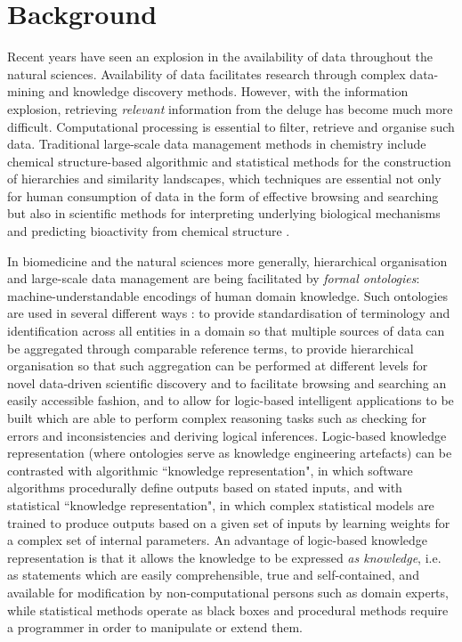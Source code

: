 \documentclass[10pt]{bmc_article}
\newenvironment{bmcformat}{\baselineskip20pt\sloppy\setboolean{publ}{false}}{\baselineskip20pt\sloppy}
\begin{document}
\begin{bmcformat}
\section*{Background}

Recent years have seen an explosion in the availability of data throughout the natural sciences. Availability of data facilitates research through complex data-mining and knowledge discovery methods. However, with the information explosion, retrieving \textit{relevant} information from the deluge has become much more difficult. Computational processing is essential to filter, retrieve and organise such data. Traditional large-scale data management methods in chemistry include chemical structure-based algorithmic and statistical methods for the construction of hierarchies and similarity landscapes, which techniques are essential not only for human consumption of data in the form of effective browsing and searching but also in scientific methods for interpreting underlying biological mechanisms and predicting bioactivity from chemical structure \cite{cacm2011}. 

In biomedicine and the natural sciences more generally, hierarchical organisation and large-scale data management are being facilitated by \textit{formal ontologies}: machine-understandable encodings of human domain knowledge. Such ontologies are used in several different ways \cite{lambrix2004,courtotsysbio2011}: to provide standardisation of terminology and identification across all entities in a domain so that multiple sources of data can be aggregated through comparable reference terms, to provide hierarchical organisation so that such aggregation can be performed at different levels for novel data-driven scientific discovery and to facilitate browsing and searching an easily accessible fashion, and to allow for logic-based intelligent applications to be built which are able to perform complex reasoning tasks such as checking for errors and inconsistencies and deriving logical inferences. Logic-based knowledge representation (where ontologies serve as knowledge engineering artefacts) can be contrasted with algorithmic ``knowledge representation", in which software algorithms procedurally define outputs based on stated inputs, and with statistical ``knowledge representation", in which complex statistical models are trained to produce outputs based on a given set of inputs by learning weights for a complex set of internal parameters.  An advantage of logic-based knowledge representation is that it allows the knowledge to be expressed \textit{as knowledge}, i.e. as statements which are easily comprehensible, true and self-contained, and available for modification by non-computational persons such as domain experts, while statistical methods operate as black boxes and procedural methods require a programmer in order to manipulate or extend them. 


\end{bmcformat}
\end{document}
